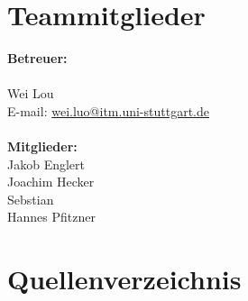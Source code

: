 \documentclass[ngerman, 12pt, letterpaper]{article}
\begin{document}
\tableofcontents
\newpage
\section{Teammitglieder}
\textbf {Betreuer:}\\
\\
 Wei Lou\\
\hfill  E-mail: \href{wei.luo@itm.uni-stuttgart.de}{wei.luo@itm.uni-stuttgart.de}\\
\\
\textbf {Mitglieder:}\\
Jakob Englert\\
Joachim Hecker\\
Sebstian\\
Hannes Pfitzner\\










\section{Quellenverzeichnis}
\end{document}
